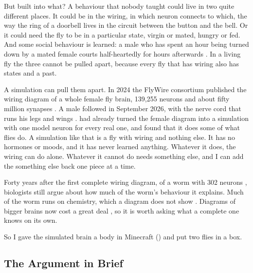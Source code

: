 But built into what? A behaviour that nobody taught could live in two quite different places. It could be in the wiring, in which neuron connects to which, the way the ring of a doorbell lives in the circuit between the button and the bell. Or it could need the fly to be in a particular state, virgin or mated, hungry or fed. And some social behaviour is learned: a male who has spent an hour being turned down by a mated female courts half-heartedly for hours afterwards \citep{siegel1979conditioned}. In a living fly the three cannot be pulled apart, because every fly that has wiring also has states and a past.

A simulation can pull them apart. In 2024 the FlyWire consortium published the wiring diagram of a whole female fly brain, 139{,}255 neurons and about fifty million synapses \citep{dorkenwald2024neuronal}. A male followed in September 2026, with the nerve cord that runs his legs and wings \citep{berg2026sexual}. \citet{shiu2024drosophila} had already turned the female diagram into a simulation with one model neuron for every real one, and found that it does some of what flies do. A simulation like that is a fly with wiring and nothing else. It has no hormones or moods, and it has never learned anything. Whatever it does, the wiring can do alone. Whatever it cannot do needs something else, and I can add the something else back one piece at a time.

Forty years after the first complete wiring diagram, of a worm with 302 neurons \citep{white1986structure}, biologists still argue about how much of the worm's behaviour it explains. Much of the worm runs on chemistry, which a diagram does not show \citep{bargmann2013connectome}. Diagrams of bigger brains now cost a great deal \citep{microns2025functional}, so it is worth asking what a complete one knows on its own.

So I gave the simulated brain a body in Minecraft () and put two flies in a box.

\subsection{The Argument in Brief}
\label{sec:brief}

